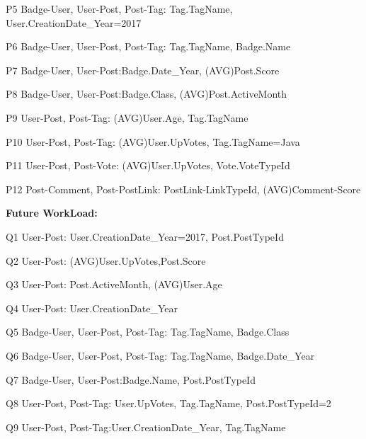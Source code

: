 P5 \hspace{3mm} Badge-User, User-Post, Post-Tag: Tag.TagName, User.CreationDate\_Year=2017

P6 \hspace{3mm} Badge-User, User-Post, Post-Tag: Tag.TagName, Badge.Name

P7 \hspace{3mm} Badge-User, User-Post:Badge.Date\_Year, (AVG)Post.Score

P8 \hspace{3mm} Badge-User, User-Post:Badge.Class, (AVG)Post.ActiveMonth

P9 \hspace{3mm} User-Post, Post-Tag: (AVG)User.Age, Tag.TagName

P10 \hspace{1.3mm} User-Post, Post-Tag: (AVG)User.UpVotes, Tag.TagName=Java

P11 \hspace{1.3mm} User-Post, Post-Vote: (AVG)User.UpVotes, Vote.VoteTypeId

P12 \hspace{1.3mm} Post-Comment, Post-PostLink: PostLink-LinkTypeId, (AVG)Comment-Score


\par
\textbf{Future WorkLoad:}

Q1 \hspace{3mm} User-Post: User.CreationDate\_Year=2017, Post.PostTypeId

Q2 \hspace{3mm} User-Post: (AVG)User.UpVotes,Post.Score

Q3 \hspace{3mm} User-Post: Post.ActiveMonth, (AVG)User.Age

Q4 \hspace{3mm} User-Post: User.CreationDate\_Year

Q5 \hspace{3mm} Badge-User, User-Post, Post-Tag: Tag.TagName, Badge.Class

Q6 \hspace{3mm} Badge-User, User-Post, Post-Tag: Tag.TagName, Badge.Date\_Year

Q7 \hspace{3mm} Badge-User, User-Post:Badge.Name, Post.PostTypeId

Q8 \hspace{3mm} User-Post, Post-Tag: User.UpVotes, Tag.TagName, Post.PostTypeId=2

Q9 \hspace{3mm} User-Post, Post-Tag:User.CreationDate\_Year, Tag.TagName

